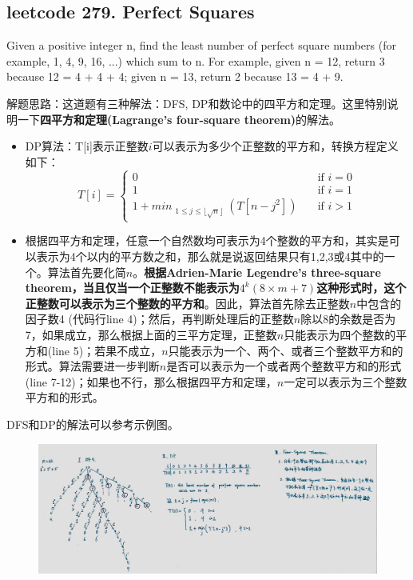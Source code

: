 \documentclass[a4paper,10pt]{article}
\begin{document}
\subsection{leetcode 279. Perfect Squares}
Given a positive integer n, find the least number of perfect square numbers (for example, 1, 4, 9, 16, ...) which sum to n. For example, given n = 12, return 3 because 12 = 4 + 4 + 4; given n = 13, return 2 because 13 = 4 + 9. \\

\begin{CJK*}{UTF8}{gbsn}
\noindent 解题思路：这道题有三种解法：DFS, DP和数论中的四平方和定理。这里特别说明一下\textbf{四平方和定理(Lagrange's four-square theorem)}的解法。
\begin{itemize}
    \item DP算法：T[i]表示正整数$i$可以表示为多少个正整数的平方和，转换方程定义如下：
    \[ T[i] =
      \begin{cases}
        0  & \quad \text{if } i=0\\
        1  & \quad \text{if } i=1\\
        1 + min_{\substack{1\leq j \leq \lfloor \sqrt{n} \rfloor}}(T[n-j^2])  & \quad \text{if } i>1
      \end{cases}
    \]
    
    \item 根据四平方和定理，任意一个自然数均可表示为4个整数的平方和，其实是可以表示为4个以内的平方数之和，那么就是说返回结果只有1,2,3或4其中的一个。算法首先要化简$n$。\textbf{根据Adrien-Marie Legendre's three-square theorem，当且仅当一个正整数不能表示为$4^k(8\times m + 7)$这种形式时，这个正整数可以表示为三个整数的平方和}。因此，算法首先除去正整数$n$中包含的因子数4 (代码行line 4)；然后，再判断处理后的正整数$n$除以8的余数是否为7，如果成立，那么根据上面的三平方定理，正整数$n$只能表示为四个整数的平方和(line 5)；若果不成立，$n$只能表示为一个、两个、或者三个整数平方和的形式。算法需要进一步判断$n$是否可以表示为一个或者两个整数平方和的形式(line 7-12)；如果也不行，那么根据四平方和定理，$n$一定可以表示为三个整数平方和的形式。
\end{itemize}
\noindent DFS和DP的解法可以参考示例图。
\end{CJK*}

\begin{figure}[h]
\includegraphics[width=\textwidth]{leetcode279.jpg}
\centering\\
\end{figure}
\end{document}
